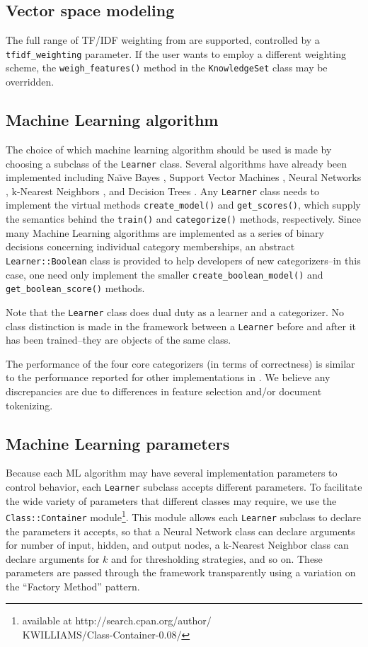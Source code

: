 \documentclass[a4paper,twocolumn]{article}
\begin{document}
\subsection{Vector space modeling}
The full range of TF/IDF weighting from \cite{salton:88} are supported, controlled by a \texttt{tfidf\_weighting} parameter.  If the user wants to employ a different weighting scheme, the \texttt{weigh\_features()} method in the \texttt{KnowledgeSet} class may be overridden.

\subsection{Machine Learning algorithm}
The choice of which machine learning algorithm should be used is made by choosing a subclass of the \texttt{Learner} class.  Several algorithms have already been implemented including Na\"\i ve Bayes \cite{lewis:98}, Support Vector Machines \cite{scholkopf:99} \cite{cortes:95}, Neural Networks \cite{calvo:01} \cite{yang:99}, k-Nearest Neighbors \cite{yang:99}, and Decision Trees \cite{quinlan:89}.  Any \texttt{Learner} class needs to implement the virtual methods \texttt{create\_model()} and \texttt{get\_scores()}, which supply the semantics behind the \texttt{train()} and \texttt{categorize()} methods, respectively.  Since many Machine Learning algorithms are implemented as a series of binary decisions concerning individual category memberships, an abstract \texttt{Learner::Boolean} class is provided to help developers of new categorizers--in this case, one need only implement the smaller \texttt{create\_boolean\_model()} and \texttt{get\_boolean\_score()} methods.

Note that the \texttt{Learner} class does dual duty as a learner and a categorizer.  No class distinction is made in the framework between a \texttt{Learner} before and after it has been trained--they are objects of the same class.

The performance of the four core categorizers (in terms of correctness) is similar to the performance reported for other implementations in \cite{yang:99}.  We believe any discrepancies are due to differences in feature selection and/or document tokenizing.

\subsection{Machine Learning parameters}
Because each ML algorithm may have several implementation parameters to control behavior, each \texttt{Learner} subclass accepts different parameters.  To facilitate the wide variety of parameters that different classes may require, we use the \texttt{Class::Container} module\footnote{available at http://search.cpan.org/author/\\ KWILLIAMS/Class-Container-0.08/}.  This module allows each \texttt{Learner} subclass to declare the parameters it accepts, so that a Neural Network class can declare arguments for number of input, hidden, and output nodes, a k-Nearest Neighbor class can declare arguments for $k$ and for thresholding strategies, and so on.  These parameters are passed through the framework transparently using a variation on the ``Factory Method'' pattern. \cite{gamma:95}
\end{document}
